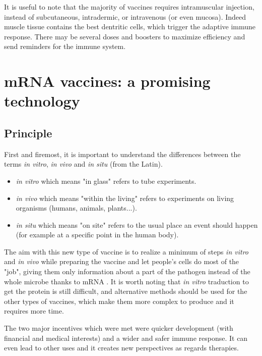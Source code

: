 \documentclass{article}
\begin{document}
            It is useful to note that the majority of vaccines requires intramuscular injection, instead of subcutaneous, intradermic, or intravenous (or even mucosa).
                Indeed muscle tissue contains the best dentritic cells, which trigger the adaptive immune response.
            There may be several doses and boosters to maximize efficiency and send reminders for the immune system. 


    \section{mRNA vaccines: a promising technology}

        \subsection{Principle}

                First and firemost, it is important to understand the differences between the terms \emph{in vitro}, \emph{in vivo} and \emph{in situ} (from the Latin).
                \begin{itemize}
                    \item \emph{in vitro} which means "in glass" refers to tube experiments.
                    \item \emph{in vivo} which means "within the living" refers to experiments on living organisms (humans, animals, plants...).
                    \item \emph{in situ} which means "on site" refers to the usual place an event should happen (for example at a specific point in the human body).
                \end{itemize}
                The aim with this new type of vaccine is to realize a minimum of steps \emph{in vitro} and \emph{in vivo} while preparing the vaccine and
                    let people's cells do most of the "job", giving them only information about a part of the pathogen instead of the whole microbe thanks
                    to mRNA \autocite{maruggiMRNATransformativeTechnology2019}.         
                It is worth noting that \emph{in vitro} traduction to get the protein is still difficult, and alternative methods should be used for the other
                    types of vaccines, which make them more complex to produce and it requires more time.

                The two major incentives which were met were quicker development (with financial and medical interests) and a wider and safer immune response.
                It can even lead to other uses and it creates new perspectives as regards therapies.
\end{document}

